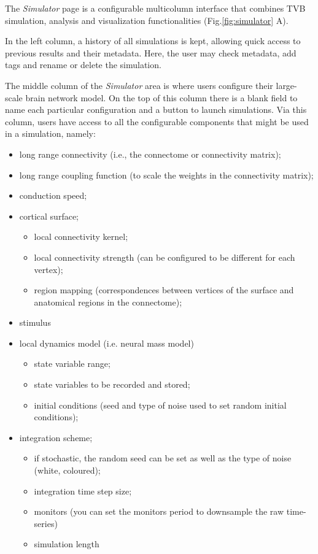 		The \emph{Simulator} page is a configurable multicolumn interface 
        that combines TVB simulation, analysis and visualization functionalities (Fig.\ref{fig:simulator} A).

		In the left column, a history of all simulations is kept, allowing
        quick access to previous results and their metadata. Here, the user
        may check metadata, add tags and rename or delete the simulation.

		The middle column of the \emph{Simulator} area is where users configure their
		large-scale brain network model. On the top of this column there is a blank
		field to name each particular configuration and a button to launch simulations.
		Via this column, users have access to all the configurable components that might
		be used in a simulation, namely:

		{\small

		\begin{itemize}
			\item long range connectivity (i.e., the connectome or connectivity matrix);
			\item long range coupling function (to scale the weights in the connectivity matrix);
			\item conduction speed;
			\item cortical surface;
			\begin{itemize}
				\item local connectivity kernel;
				\item local connectivity strength (can be configured to be different for each vertex);
				\item region mapping (correspondences between vertices of the surface and anatomical regions in the connectome);
			\end{itemize}
			\item stimulus
			\item local dynamics model (i.e. neural mass model)
				\begin{itemize}
					\item state variable range;
					\item state variables to be recorded and stored;
					\item initial conditions (seed and type of noise used to set random initial conditions);
				\end{itemize}
			\item integration scheme;
			\begin{itemize}
				\item if stochastic, the random seed can be set as well as the type of noise (white, coloured);
				\item integration time step size;
			\item monitors (you can set the monitors period to downsample the raw time-series)
			\item simulation length
			\end{itemize}
		\end{itemize}
		}

